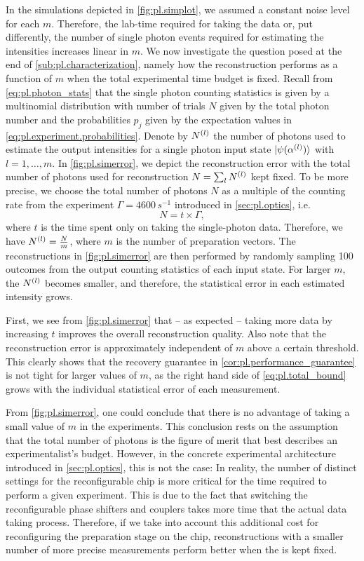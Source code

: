In the simulations depicted in \cref{fig:pl.simplot}, we assumed a constant noise level for each $m$.
Therefore, the lab-time required for taking the data or, put differently, the number of single photon events required for estimating the intensities increases linear in $m$.
We now investigate the question posed at the end of \cref{sub:pl.characterization}, namely how the reconstruction performs as a function of $m$ when the total experimental time budget is fixed.
Recall from \cref{eq:pl.photon_stats} that the single photon counting statistics is given by a multinomial distribution with number of trials $N$ given by the total photon number and the probabilities $p_j$ given by the expectation values in \cref{eq:pl.experiment.probabilities}.
Denote by $N^{(l)}$ the number of photons used to estimate the output intensities for a single photon input state $\ket{\psi(\alpha\ind{l})}$ with $l=1,\ldots,m$.
In \cref{fig:pl.simerror}, we depict the reconstruction error with the total number of photons used for reconstruction $N = \sum_l N^{(l)}$ kept fixed.
To be more precise, we choose the total number of photons $N$ as a multiple of the counting rate from the experiment $\Gamma = 4600\,s^{-1}$ introduced in \cref{sec:pl.optics}, i.e.
\[
  N = t \times \Gamma,
  \label{eq:pl.counts_from_time}
\]
where $t$ is the time spent only on taking the single-photon data.
Therefore, we have $N^{(l)} = \frac{N}{m}$, where $m$ is the number of preparation vectors.
The reconstructions in \cref{fig:pl.simerror} are then performed by randomly sampling 100 outcomes from the output counting statistics of each input state.
For larger $m$, the $N^{(l)}$ becomes smaller, and therefore, the statistical error in each estimated intensity grows.

First, we see from \cref{fig:pl.simerror} that -- as expected -- taking more data by increasing $t$ improves the overall reconstruction quality.
Also note that the reconstruction error is approximately independent of $m$ above a certain threshold.
This clearly shows that the recovery guarantee in \cref{cor:pl.performance_guarantee} is not tight for larger values of $m$, as the right hand side of \cref{eq:pl.total_bound} grows with the individual statistical error of each measurement.

From \cref{fig:pl.simerror}, one could conclude that there is no advantage of taking a small value of $m$ in the experiments.
This conclusion rests on the assumption that the total number of photons is the figure of merit that best describes an experimentalist's budget.
However, in the concrete experimental architecture introduced in \cref{sec:pl.optics}, this is not the case:
In reality, the number of distinct settings for the reconfigurable chip is more critical for the time required to perform a given experiment.
This is due to the fact that switching the reconfigurable phase shifters and couplers takes more time that the actual data taking process.
Therefore, if we take into account this additional cost for reconfiguring the preparation stage on the chip, reconstructions with a smaller number of more precise measurements perform better when the  is kept fixed.




